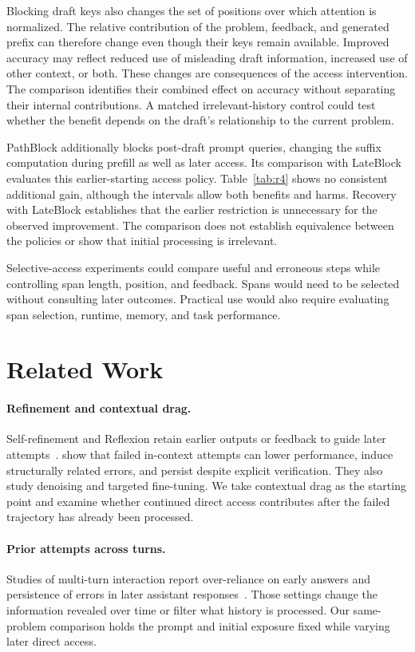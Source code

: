 \documentclass{article}
\newcommand{\lateblock}{\ifmmode\mathrm{LateBlock}\else\textup{LateBlock}\fi}
\newcommand{\pathblock}{\ifmmode\mathrm{PathBlock}\else\textup{PathBlock}\fi}
\begin{document}
Blocking draft keys also changes the set of positions over which attention is normalized. The relative contribution of the problem, feedback, and generated prefix can therefore change even though their keys remain available. Improved accuracy may reflect reduced use of misleading draft information, increased use of other context, or both. These changes are consequences of the access intervention. The comparison identifies their combined effect on accuracy without separating their internal contributions. A matched irrelevant-history control could test whether the benefit depends on the draft's relationship to the current problem.

\pathblock{} additionally blocks post-draft prompt queries, changing the suffix computation during prefill as well as later access. Its comparison with \lateblock{} evaluates this earlier-starting access policy. Table~\ref{tab:r4} shows no consistent additional gain, although the intervals allow both benefits and harms. Recovery with \lateblock{} establishes that the earlier restriction is unnecessary for the observed improvement. The comparison does not establish equivalence between the policies or show that initial processing is irrelevant.

Selective-access experiments could compare useful and erroneous steps while controlling span length, position, and feedback. Spans would need to be selected without consulting later outcomes. Practical use would also require evaluating span selection, runtime, memory, and task performance.

\section{Related Work}

\paragraph{Refinement and contextual drag.}
Self-refinement and Reflexion retain earlier outputs or feedback to guide later attempts~\citep{madaan2023selfrefine,shinn2023reflexion}. \citet{cheng2026contextualdrag} show that failed in-context attempts can lower performance, induce structurally related errors, and persist despite explicit verification. They also study denoising and targeted fine-tuning. We take contextual drag as the starting point and examine whether continued direct access contributes after the failed trajectory has already been processed.

\paragraph{Prior attempts across turns.}
Studies of multi-turn interaction report over-reliance on early answers and persistence of errors in later assistant responses~\citep{laban2026lostconversation,huang2026ownwords}. Those settings change the information revealed over time or filter what history is processed. Our same-problem comparison holds the prompt and initial exposure fixed while varying later direct access.
\end{document}
